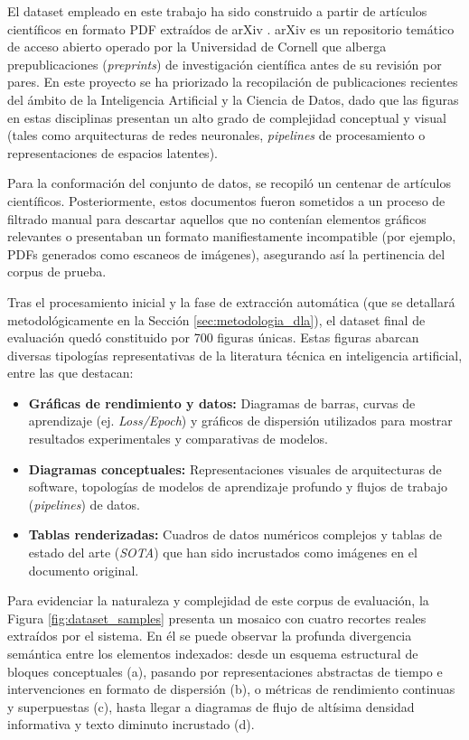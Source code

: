 \documentclass[a4paper]{report}
\begin{document}
El dataset empleado en este trabajo ha sido construido a partir de artículos científicos en formato PDF extraídos de arXiv \cite{clement2019arxiv}. arXiv es un repositorio temático de acceso abierto operado por la Universidad de Cornell que alberga prepublicaciones (\textit{preprints}) de investigación científica antes de su revisión por pares. En este proyecto se ha priorizado la recopilación de publicaciones recientes del ámbito de la Inteligencia Artificial y la Ciencia de Datos, dado que las figuras en estas disciplinas presentan un alto grado de complejidad conceptual y visual (tales como arquitecturas de redes neuronales, \textit{pipelines} de procesamiento o representaciones de espacios latentes).

Para la conformación del conjunto de datos, se recopiló un centenar de artículos científicos. Posteriormente, estos documentos fueron sometidos a un proceso de filtrado manual para descartar aquellos que no contenían elementos gráficos relevantes o presentaban un formato manifiestamente incompatible (por ejemplo, PDFs generados como escaneos de imágenes), asegurando así la pertinencia del corpus de prueba. 

Tras el procesamiento inicial y la fase de extracción automática (que se detallará metodológicamente en la Sección \ref{sec:metodologia_dla}), el dataset final de evaluación quedó constituido por 700 figuras únicas. Estas figuras abarcan diversas tipologías representativas de la literatura técnica en inteligencia artificial, entre las que destacan:
\begin{itemize}
    \item \textbf{Gráficas de rendimiento y datos:} Diagramas de barras, curvas de aprendizaje (ej. \textit{Loss/Epoch}) y gráficos de dispersión utilizados para mostrar resultados experimentales y comparativas de modelos.
    \item \textbf{Diagramas conceptuales:} Representaciones visuales de arquitecturas de software, topologías de modelos de aprendizaje profundo y flujos de trabajo (\textit{pipelines}) de datos.
    \item \textbf{Tablas renderizadas:} Cuadros de datos numéricos complejos y tablas de estado del arte (\textit{SOTA}) que han sido incrustados como imágenes en el documento original.
\end{itemize}

Para evidenciar la naturaleza y complejidad de este corpus de evaluación, la Figura \ref{fig:dataset_samples} presenta un mosaico con cuatro recortes reales extraídos por el sistema. En él se puede observar la profunda divergencia semántica entre los elementos indexados: desde un esquema estructural de bloques conceptuales (a), pasando por representaciones abstractas de tiempo e intervenciones en formato de dispersión (b), o métricas de rendimiento continuas y superpuestas (c), hasta llegar a diagramas de flujo de altísima densidad informativa y texto diminuto incrustado (d).
\end{document}
